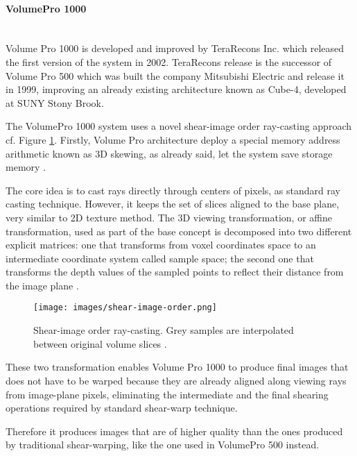 \documentclass[12pt,a4paper]{extarticle}
\newcommand{\linespace}{\vspace{0pt}}
\newcommand{\myparagraph}[1]{\paragraph{#1}\mbox{}\\}
\begin{document}
\myparagraph{VolumePro 1000} Volume Pro 1000 is developed and improved by TeraRecons Inc. which released the first version of the system in 2002. TeraRecons release is the successor of Volume Pro 500 which was built  the company Mitsubishi Electric and release it in 1999, improving an already existing architecture known as Cube-4, developed at SUNY Stony Brook.
\linespace

The VolumePro 1000 system \cite {Wu:2003:SOR:641480.641510}
uses a novel shear-image order ray-casting approach cf. Figure \ref{fig:shearimageorder}.
 Firstly, Volume Pro architecture deploy a special memory address arithmetic known as 3D skewing, as already said, let the system save storage memory \cite{PFISTER2005229}. 
\linespace

The core idea is to cast rays directly through centers of pixels, as standard ray casting technique. However, it keeps the set of slices aligned to the base plane, very similar to 2D texture method. The 3D viewing transformation, or affine transformation, used as part of the base concept is decomposed into two different explicit matrices: one that transforms from voxel coordinates space to an intermediate coordinate system called sample space; the second one that transforms the depth values of the sampled points to reflect their distance from the image plane \cite{PFISTER2005229}.

\begin{figure}[hbtp]
\centering
\texttt{[image: images/shear-image-order.png]}
\caption{Shear-image order ray-casting. Grey samples are interpolated between original volume slices \cite{PFISTER2005229}.}
\label{fig:shearimageorder}
\end{figure}


These two transformation enables Volume Pro 1000 to produce final images that does not have to be warped because they are already aligned along viewing rays from image-plane pixels, eliminating the intermediate and the final shearing operations required by standard shear-warp technique. 

Therefore it produces images that are of higher quality than the ones produced by traditional shear-warping, like the one used in VolumePro 500 instead. %
\linespace
\end{document}
